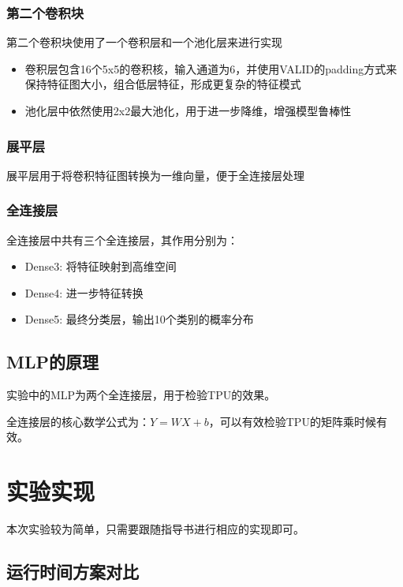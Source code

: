 \documentclass[12pt,a4paper]{article}
\begin{document}
\subsubsection{第二个卷积块}

第二个卷积块使用了一个卷积层和一个池化层来进行实现

\begin{itemize}
\item
  卷积层包含16个5x5的卷积核，输入通道为6，并使用VALID的padding方式来保持特征图大小，组合低层特征，形成更复杂的特征模式
\item
  池化层中依然使用2x2最大池化，用于进一步降维，增强模型鲁棒性
\end{itemize}

\subsubsection{展平层}

展平层用于将卷积特征图转换为一维向量，便于全连接层处理

\subsubsection{全连接层}

全连接层中共有三个全连接层，其作用分别为：

\begin{itemize}
\item
  Dense3: 将特征映射到高维空间
\item
  Dense4: 进一步特征转换
\item
  Dense5: 最终分类层，输出10个类别的概率分布
\end{itemize}

\subsection{MLP的原理}

实验中的MLP为两个全连接层，用于检验TPU的效果。

全连接层的核心数学公式为：$Y = WX + b$，可以有效检验TPU的矩阵乘时候有效。

\section{实验实现}

本次实验较为简单，只需要跟随指导书进行相应的实现即可。

\subsection{运行时间方案对比}
\end{document}
